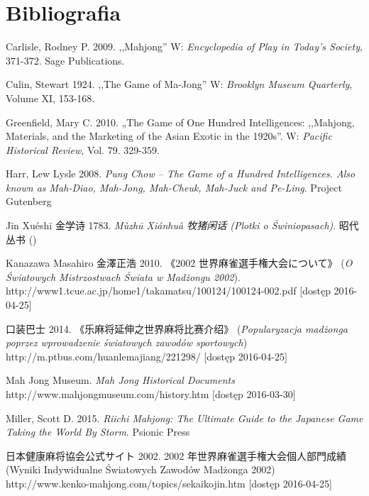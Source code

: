 \onecolumn
\section*{Bibliografia}
\setlength{\parindent}{0pt}
\setlength{\parskip}{1ex plus 0.5ex minus 0.2ex}
Carlisle, Rodney P. 2009. ,,Mahjong'' W: \textit{Encyclopedia of Play in Today's
Society}, 371-372.
Sage Publications.

Culin, Stewart 1924. ,,The Game of Ma-Jong'' W: \textit{Brooklyn Museum
Quarterly}, Volume XI, 153-168.


Greenfield, Mary C. 2010. „The Game of One Hundred Intelligences: ,,Mahjong,
Materials, and the Marketing of the Asian Exotic in the 1920s''. W:
\textit{Pacific Historical Review}, Vol. 79. 329-359.

Harr, Lew Lysle 2008. \textit{Pung Chow -- The Game of a Hundred Intelligences.
Also known as Mah-Diao, Mah-Jong, Mah-Cheuk, Mah-Juck and Pe-Ling}. Project
Gutenberg

Jīn Xuéshī 金学诗 1783. \textit{Mùzhū Xiánhuà 牧猪闲话 (Plotki o Świniopasach)}.
昭代丛书 ()

Kanazawa Masahiro 金澤正浩 2010.  《2002 世界麻雀選手権大会について》 (\textit{O Światowych Mistrzostwach
Świata w Madżongu 2002}).
\\http://www1.tcue.ac.jp/home1/takamatsu/100124/100124-002.pdf [dostęp
2016-04-25]

 口装巴士 2014.  《乐麻将延伸之世界麻将比赛介绍》
(\textit{Popularyzacja madżonga poprzez wprowadzenie światowych zawodów
sportowych}) \\http://m.ptbus.com/huanlemajiang/221298/ [dostęp 2016-04-25]

Mah Jong Museum. \textit{Mah Jong Historical Documents}
\\http://www.mahjongmuseum.com/history.htm [dostęp
2016-03-30]

Miller, Scott D. 2015. \textit{Riichi Mahjong: The Ultimate Guide to the
Japanese Game Taking the World By Storm}. Psionic Press

 日本健康麻将協会公式サイト  2002.
 2002 年世界麻雀選手権大会個人部門成績 (Wyniki
Indywidualne Światowych Zawodów Madżonga 2002)
\\http://www.kenko-mahjong.com/topics/sekaikojin.htm [dostęp 2016-04-25]

